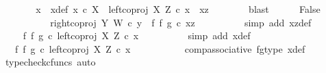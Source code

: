 \begin{isabellebody}
\ \ \ \ \isamarkupfalse%
\ \isamarkupfalse%
\ x\ \ x{\isacharunderscore}{\kern0pt}def{\isacharcolon}{\kern0pt}\ {\isachardoublequoteopen}x\ {\isasymin}\isactrlsub c\ X\ {\isasymand}\ left{\isacharunderscore}{\kern0pt}coproj\ X\ Z\ {\isasymcirc}\isactrlsub c\ x\ {\isacharequal}{\kern0pt}\ xz{\isachardoublequoteclose}\isanewline
\ \ \ \ \ \ \isamarkupfalse%
\ blast\isanewline
\ \ \ \ \isamarkupfalse%
\ False\isanewline
\ \ \ \ \isamarkupfalse%
\ {\isacharminus}{\kern0pt}\ \isanewline
\ \ \ \ \ \ \isamarkupfalse%
\ {\isachardoublequoteopen}right{\isacharunderscore}{\kern0pt}coproj\ Y\ W\ {\isasymcirc}\isactrlsub c\ y\ {\isacharequal}{\kern0pt}\ {\isacharparenleft}{\kern0pt}f\ {\isasymbowtie}\isactrlsub f\ g{\isacharparenright}{\kern0pt}\ {\isasymcirc}\isactrlsub c\ xz{\isachardoublequoteclose}\isanewline
\ \ \ \ \ \ \ \ \isamarkupfalse%
\ {\isacharparenleft}{\kern0pt}simp\ add{\isacharcolon}{\kern0pt}\ xz{\isacharunderscore}{\kern0pt}def{\isacharparenright}{\kern0pt}\isanewline
\ \ \ \ \ \ \isamarkupfalse%
\ \isamarkupfalse%
\ {\isachardoublequoteopen}{\isachardot}{\kern0pt}{\isachardot}{\kern0pt}{\isachardot}{\kern0pt}\ {\isacharequal}{\kern0pt}\ {\isacharparenleft}{\kern0pt}f\ {\isasymbowtie}\isactrlsub f\ g{\isacharparenright}{\kern0pt}\ {\isasymcirc}\isactrlsub c\ left{\isacharunderscore}{\kern0pt}coproj\ X\ Z\ {\isasymcirc}\isactrlsub c\ x{\isachardoublequoteclose}\isanewline
\ \ \ \ \ \ \ \ \isamarkupfalse%
\ {\isacharparenleft}{\kern0pt}simp\ add{\isacharcolon}{\kern0pt}\ x{\isacharunderscore}{\kern0pt}def{\isacharparenright}{\kern0pt}\isanewline
\ \ \ \ \ \ \isamarkupfalse%
\ \isamarkupfalse%
\ {\isachardoublequoteopen}{\isachardot}{\kern0pt}{\isachardot}{\kern0pt}{\isachardot}{\kern0pt}\ {\isacharequal}{\kern0pt}\ {\isacharparenleft}{\kern0pt}{\isacharparenleft}{\kern0pt}f\ {\isasymbowtie}\isactrlsub f\ g{\isacharparenright}{\kern0pt}\ {\isasymcirc}\isactrlsub c\ left{\isacharunderscore}{\kern0pt}coproj\ X\ Z{\isacharparenright}{\kern0pt}\ {\isasymcirc}\isactrlsub c\ x{\isachardoublequoteclose}\isanewline
\ \ \ \ \ \ \ \ \isamarkupfalse%
\ \ comp{\isacharunderscore}{\kern0pt}associative{}\ fg{\isacharunderscore}{\kern0pt}type\ x{\isacharunderscore}{\kern0pt}def\ \isamarkupfalse%
\ {\isacharparenleft}{\kern0pt}typecheck{\isacharunderscore}{\kern0pt}cfuncs{\isacharcomma}{\kern0pt}\ auto{\isacharparenright}{\kern0pt}\isanewline

\end{isabellebody}
